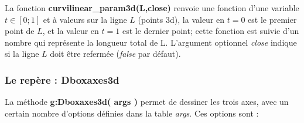La fonction \textbf{curvilinear\_param3d(L,close)} renvoie une fonction d'une variable $t\in[0;1]$ et à valeurs sur la ligne  $L$ (points 3d), la valeur en $t=0$ est le premier point de $L$, et la valeur en $t=1$ est le dernier point; cette fonction est suivie d'un nombre qui représente la longueur total de L. L'argument optionnel \emph{close} indique si la ligne $L$  doit être refermée (\emph{false} par défaut).


\subsubsection{Le repère : Dboxaxes3d}

La méthode \textbf{g:Dboxaxes3d( args )} permet de dessiner les trois axes, avec un certain nombre d'options définies dans la table \emph{args}. Ces options sont :
\def\opt#1{\textcolor{blue}{\texttt{#1}}}%

